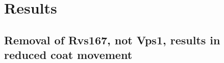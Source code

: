 \documentclass[9pt,lineno]{elife}
\begin{document}



\section{Results}

\subsection{Removal of Rvs167, not Vps1,  results in reduced coat movement}
\end{document}
